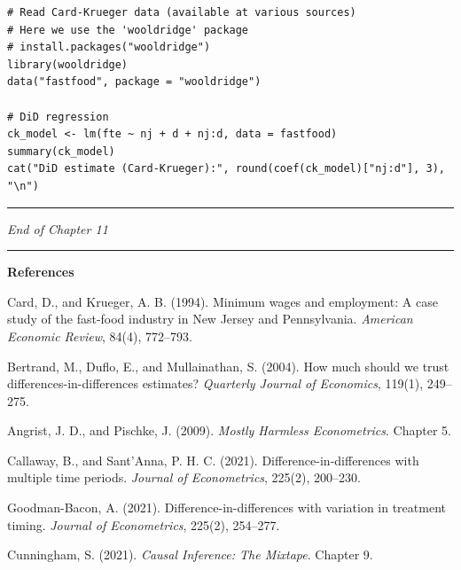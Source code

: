 \begin{lstlisting}
# Read Card-Krueger data (available at various sources)
# Here we use the 'wooldridge' package
# install.packages("wooldridge")
library(wooldridge)
data("fastfood", package = "wooldridge")

# DiD regression
ck_model <- lm(fte ~ nj + d + nj:d, data = fastfood)
summary(ck_model)
cat("DiD estimate (Card-Krueger):", round(coef(ck_model)["nj:d"], 3), "\n")
\end{lstlisting}

\medskip\hrule\medskip

\textit{End of Chapter 11}

\medskip\hrule\medskip

\textbf{References}

Card, D., and Krueger, A. B. (1994). Minimum wages and employment: A case study of the fast-food industry in New Jersey and Pennsylvania. \textit{American Economic Review}, 84(4), 772--793.

Bertrand, M., Duflo, E., and Mullainathan, S. (2004). How much should we trust differences-in-differences estimates? \textit{Quarterly Journal of Economics}, 119(1), 249--275.

Angrist, J. D., and Pischke, J. (2009). \textit{Mostly Harmless Econometrics}. Chapter 5.

Callaway, B., and Sant'Anna, P. H. C. (2021). Difference-in-differences with multiple time periods. \textit{Journal of Econometrics}, 225(2), 200--230.

Goodman-Bacon, A. (2021). Difference-in-differences with variation in treatment timing. \textit{Journal of Econometrics}, 225(2), 254--277.

Cunningham, S. (2021). \textit{Causal Inference: The Mixtape}. Chapter 9.
